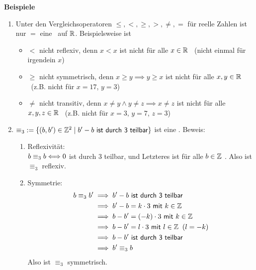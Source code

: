 \documentclass[a4paper,12pt,oneside,openany]{book}
\newcommand{\pipe}{\;|\;}
\newenvironment{beispiele}[1][]{\vspace{2mm}\normalfont\normalsize \textbf{Beispiele}\ifthenelse{\equal{#1}{}}{:}{: #1}\begin{enumerate}[label=\arabic*)]}{\end{enumerate}}
\newcommand{\überschrift}[1]{\subsubsection{#1}}
\begin{document}
\begin{beispiele}
	\item Unter den Vergleichsoperatoren \(\leq, <, \geq, >, \neq, =\) für reelle Zahlen ist nur
	\(=\) eine  ~auf \(\mathbb{R}\). Beispielsweise ist
	\begin{itemize}
		\item \(<\) nicht reflexiv, denn \(x < x\) ist nicht für alle \(x \in \mathbb{R}\) \wahr ~(nicht einmal
		      für irgendein \(x\))
		\item \(\geq\) nicht symmetrisch, denn \(x \geq y \implies y \geq x\) ist nicht für alle \(x,y \in \mathbb{R}\)
		      \wahr ~(z.B. nicht für \(x=17\), \(y=3\))
		\item \(\neq\) nicht transitiv, denn \(x \neq y \land y \neq z \implies x \neq z\) ist nicht
		      für alle \(x,y,z \in \mathbb{R}\) \wahr ~(z.B. nicht für \(x=3\), \(y=7\), \(z=3\))
	\end{itemize}

	\newpage
	\item \(\equiv_3 \;:= \{(b, b') \in \Z^2 \pipe b'-b \textsf{~ist durch 3 teilbar}\}\)
	ist eine . Beweis:
	\begin{enumerate}[label=\alph*)]
		\item Reflexivität: \\
		      \(b \equiv_3 b \Longleftrightarrow 0\) ist durch 3 teilbar, und Letzteres ist für alle
		      \(b \in \mathbb{Z}\) \wahr. Also ist \(\equiv_3\) reflexiv.

		\item Symmetrie:
		      \begin{alignat*}{3}
			      b \equiv_3 b' & \implies b' - b \textsf{~ist durch 3 teilbar}                    \\
			                    & \implies b' - b = k \cdot 3 \textsf{~mit~} k \in \mathbb{Z}              \\
			                    & \implies b - b' = (-k) \cdot 3 \textsf{~mit~} k \in \mathbb{Z}           \\
			                    & \implies b - b' = l \cdot 3 \textsf{~mit~} l \in \mathbb{Z} \;\;(l = -k) \\
			                    & \implies b - b' \textsf{~ist durch 3 teilbar}                    \\
			                    & \implies b' \equiv_3 b
		      \end{alignat*}
		      Also ist \(\equiv_3\) symmetrisch.


\end{enumerate}
\end{beispiele}
\end{document}
